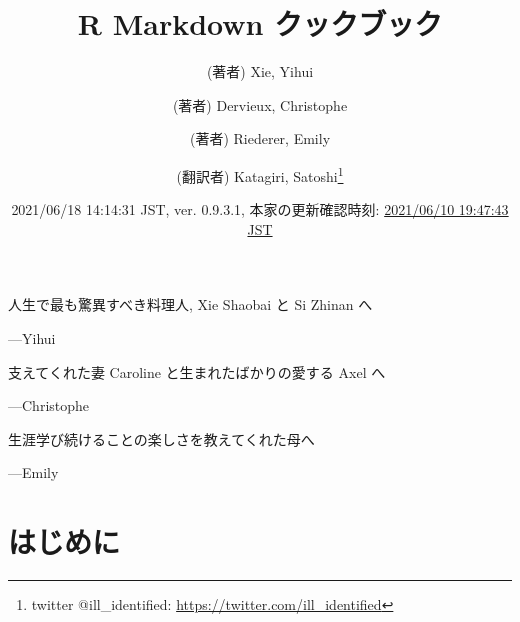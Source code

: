 \documentclass[
  11pt,
  lualatex,
  ja=standard]{bxjsreport}
\title{R Markdown クックブック}
\author{(著者) Xie, Yihui \and (著者) Dervieux, Christophe \and (著者) Riederer, Emily \and (翻訳者) Katagiri, Satoshi\footnote{twitter @ill\_identified: \url{https://twitter.com/ill_identified}}}
\date{2021/06/18 14:14:31 JST, ver. 0.9.3.1, 本家の更新確認時刻: \href{https://github.com/yihui/rmarkdown-cookbook}{2021/06/10 19:47:43 JST}}
\begin{document}
\maketitle

\cleardoublepage\newpage\thispagestyle{empty}\null
\cleardoublepage\newpage\thispagestyle{empty}\null
\thispagestyle{empty}
\begin{large}
人生で最も驚異すべき料理人, Xie Shaobai と Si Zhinan へ
\begin{flushright}
---Yihui
\end{flushright}

\bigskip

支えてくれた妻 Caroline と生まれたばかりの愛する Axel へ
\begin{flushright}
---Christophe
\end{flushright}

\bigskip

生涯学び続けることの楽しさを教えてくれた母へ
\begin{flushright}
---Emily
\end{flushright}
\end{large}

\setlength{\abovedisplayskip}{-5pt}
\setlength{\abovedisplayshortskip}{-5pt}

{
\hypersetup{linkcolor=}
\setcounter{tocdepth}{2}
\tableofcontents
}
\listoftables
\listoffigures
\hypertarget{ux306fux3058ux3081ux306b}{%
\chapter*{はじめに}\label{ux306fux3058ux3081ux306b}}
\end{document}
